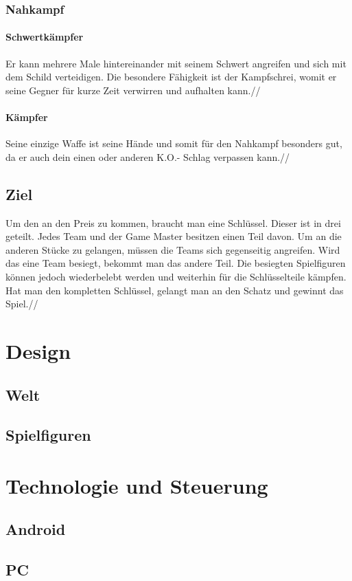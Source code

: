 \documentclass[10pt,a4paper,notitlepage]{report}
\begin{document}
\begin{flushleft}
\subsection{Nahkampf}
\subsubsection{Schwertkämpfer}
Er kann mehrere Male hintereinander mit seinem Schwert angreifen und sich mit dem Schild verteidigen. Die besondere Fähigkeit ist der Kampfschrei, womit er seine Gegner für kurze Zeit verwirren und aufhalten kann.//
\subsubsection{Kämpfer}
Seine einzige Waffe ist seine Hände und somit für den Nahkampf besonders gut, da er auch dein einen oder anderen K.O.- Schlag verpassen kann.//
\section{Ziel}
Um den an den Preis zu kommen, braucht man eine Schlüssel. Dieser ist in drei  geteilt. Jedes Team und der Game Master besitzen einen Teil davon. Um an die anderen Stücke zu gelangen, müssen die Teams sich gegenseitig angreifen. Wird das eine Team besiegt, bekommt man das andere Teil. Die besiegten Spielfiguren können jedoch wiederbelebt werden und weiterhin für die Schlüsselteile kämpfen. Hat man den kompletten Schlüssel, gelangt man an den Schatz und gewinnt das Spiel.//

\chapter{Design}
\section{Welt}
\section{Spielfiguren}

\chapter{Technologie und Steuerung}
\section{Android}
\section{PC}


\end{flushleft}
\end{document}
